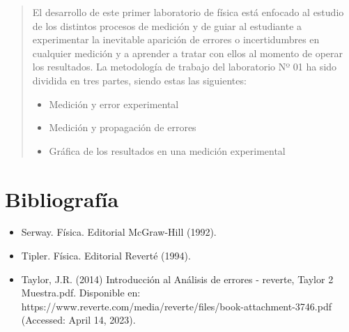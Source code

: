 \documentclass[10pt]{article}
\begin{document}
\newpage

\tableofcontents

\newpage

\begin{abstract}
	El desarrollo de este primer laboratorio de física está enfocado al estudio de los distintos procesos de medición y de guiar al estudiante a experimentar la inevitable aparición de errores o incertidumbres en cualquier medición y a aprender a tratar con ellos al momento de operar los resultados.
	La metodología de trabajo del laboratorio Nº 01 ha sido dividida en tres partes, siendo estas las siguientes:
	\begin{itemize}
		\item Medición y error experimental
		\item Medición y propagación de errores
		\item Gráfica de los resultados en una medición experimental
	\end{itemize}

\end{abstract}



\newpage



\newpage



\section{Bibliografía}
\begin{itemize}
	\item  Serway. F\'isica. Editorial McGraw-Hill (1992).\\
	\item Tipler. Física. Editorial Revert\'e (1994). \\
	\item Taylor, J.R. (2014) Introducci\'on al Análisis de errores - reverte, Taylor 2 Muestra.pdf. Disponible en: https://www.reverte.com/media/reverte/files/book-attachment-3746.pdf (Accessed: April 14, 2023).
\end{itemize}
\end{document}
